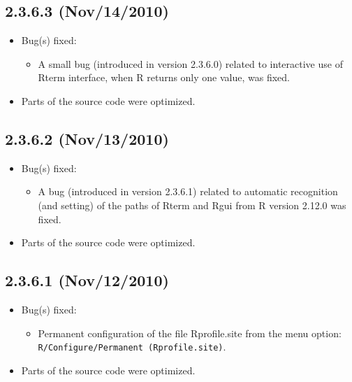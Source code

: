 \subsection*{2.3.6.3 (Nov/14/2010)}
\begin{itemize}
  \item Bug(s) fixed:
    \begin{itemize}
      \item A small bug (introduced in version 2.3.6.0) related to interactive use of Rterm interface,
        when R returns only one value, was fixed.
    \end{itemize}
  \item Parts of the source code were optimized.
\end{itemize}


\subsection*{2.3.6.2 (Nov/13/2010)}
\begin{itemize}
  \item Bug(s) fixed:
    \begin{itemize}
      \item A bug (introduced in version 2.3.6.1) related to automatic recognition (and setting) of the paths
        of Rterm and Rgui from R version 2.12.0 was fixed.
    \end{itemize}
  \item Parts of the source code were optimized.
\end{itemize}


\subsection*{2.3.6.1 (Nov/12/2010)}
\begin{itemize}
  \item Bug(s) fixed:
    \begin{itemize}
      \item Permanent configuration of the file Rprofile.site from the menu option: \texttt{R/Configure/Permanent (Rprofile.site)}.
    \end{itemize}
  \item Parts of the source code were optimized.
\end{itemize}


